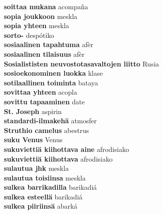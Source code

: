 \textbf{ soittaa mukana  } acompaña \\
\textbf{ sopia joukkoon  } meskla \\
\textbf{ sopia yhteen  } meskla \\
\textbf{ sorto-  } despótiko \\
\textbf{ sosiaalinen tapahtuma  } afèr \\
\textbf{ sosiaalinen tilaisuus  } afèr \\
\textbf{ Sosialististen neuvostotasavaltojen liitto  } Rusia \\
\textbf{ sosioekonominen luokka  } klase \\
\textbf{ sotilaallinen toiminta  } bataya \\
\textbf{ sovittaa yhteen  } acopla \\
\textbf{ sovittu tapaaminen  } date \\
\textbf{ St. Joseph  } aspirin \\
\textbf{ standardi-ilmakehä  } atmosfer \\
\textbf{ Struthio camelus  } abestrus \\
\textbf{ suku Venus  } Venus \\
\textbf{ sukuviettiä kiihottava aine  } afrodisiako \\
\textbf{ sukuviettiä kiihottava  } afrodisiako \\
\textbf{ sulautua jhk  } meskla \\
\textbf{ sulautua toisiinsa  } meskla \\
\textbf{ sulkea barrikadilla  } barikadiá \\
\textbf{ sulkea esteellä  } barikadiá \\
\textbf{ sulkea piiriinsä  } abarká \\
